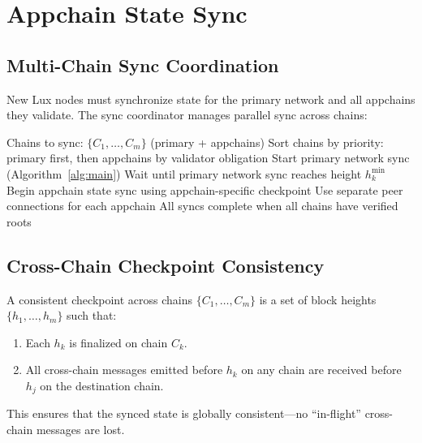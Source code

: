 \section{Appchain State Sync}
\label{sec:appchain}

\subsection{Multi-Chain Sync Coordination}

New Lux nodes must synchronize state for the primary network and all appchains they validate. The sync coordinator manages parallel sync across chains:

\begin{algorithm}[H]
\caption{Multi-Chain Sync Coordinator}
\label{alg:coordinator}
\begin{algorithmic}[1]
\Require Chains to sync: $\{C_1, \ldots, C_m\}$ (primary + appchains)
\State Sort chains by priority: primary first, then appchains by validator obligation
\State Start primary network sync (Algorithm~\ref{alg:main})
    \State Wait until primary network sync reaches height $h_k^{\text{min}}$
    \State Begin appchain state sync using appchain-specific checkpoint
    \State Use separate peer connections for each appchain
\EndFor
\State All syncs complete when all chains have verified roots
\end{algorithmic}
\end{algorithm}

\subsection{Cross-Chain Checkpoint Consistency}

\begin{definition}
A consistent checkpoint across chains $\{C_1, \ldots, C_m\}$ is a set of block heights $\{h_1, \ldots, h_m\}$ such that:
\begin{enumerate}
    \item Each $h_k$ is finalized on chain $C_k$.
    \item All cross-chain messages emitted before $h_k$ on any chain are received before $h_j$ on the destination chain.
\end{enumerate}
\end{definition}

This ensures that the synced state is globally consistent---no ``in-flight'' cross-chain messages are lost.

